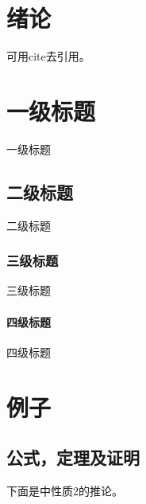 \documentclass[openany,oneside]{book}
\theoremstyle{cthmstyle}
\theoremstyle{remark}
\begin{document}
\frontmatter
\sloppy %




\tableofcontents
{\xiaosi}
\clearpage{\pagestyle{empty}\cleardoublepage}

\mainmatter
{}                        %

\chapter{绪论}

可用cite去引用。\cite{dean2008mapreduce, marxapplication}

\lipsum



\chapter{一级标题}

一级标题

\section{二级标题}

{\hei 二级标题}

\subsection{三级标题}

三级标题

\subsubsection{四级标题}

四级标题

\chapter{例子}

\section{公式，定理及证明}

下面是\cite{bzj2006constcurative}中性质2的推论。
\end{document}
